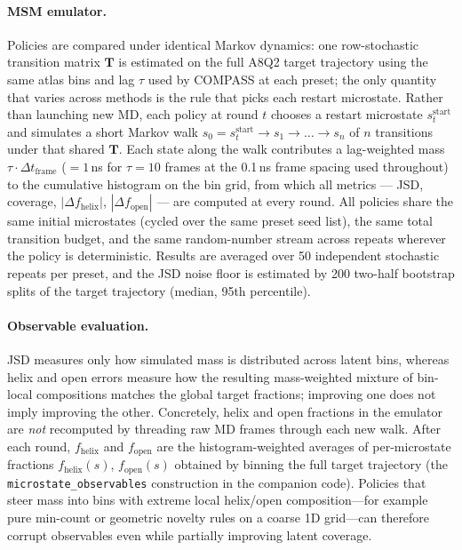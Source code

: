 \documentclass[journal=jctcce,manuscript=article,layout=twocolumn]{achemso}
\begin{document}
\paragraph{MSM emulator.} Policies are compared under identical Markov dynamics: one row-stochastic transition matrix $\mathbf{T}$ is estimated on the full A8Q2 target trajectory using the same atlas bins and lag $\tau$ used by COMPASS at each preset; the only quantity that varies across methods is the rule that picks each restart microstate. Rather than launching new MD, each policy at round $t$ chooses a restart microstate $s^{\mathrm{start}}_t$ and simulates a short Markov walk $s_0=s^{\mathrm{start}}_t \to s_1 \to \ldots \to s_{n}$ of $n$ transitions under that shared $\mathbf{T}$. Each state along the walk contributes a lag-weighted mass $\tau\cdot\Delta t_{\mathrm{frame}}$ ($=1$\,ns for $\tau=10$ frames at the 0.1\,ns frame spacing used throughout) to the cumulative histogram on the bin grid, from which all metrics --- JSD, coverage, $|\Delta f_{\mathrm{helix}}|$, $|\Delta f_{\mathrm{open}}|$ --- are computed at every round. All policies share the same initial microstates (cycled over the same preset seed list), the same total transition budget, and the same random-number stream across repeats wherever the policy is deterministic. Results are averaged over 50 independent stochastic repeats per preset, and the JSD noise floor is estimated by 200 two-half bootstrap splits of the target trajectory (median, 95th percentile).

\paragraph{Observable evaluation.} JSD measures only how simulated mass is distributed across latent bins, whereas helix and open errors measure how the resulting mass-weighted mixture of bin-local compositions matches the global target fractions; improving one does not imply improving the other. Concretely, helix and open fractions in the emulator are \emph{not} recomputed by threading raw MD frames through each new walk. After each round, $f_{\mathrm{helix}}$ and $f_{\mathrm{open}}$ are the histogram-weighted averages of per-microstate fractions $f_{\mathrm{helix}}(s)$, $f_{\mathrm{open}}(s)$ obtained by binning the full target trajectory (the \texttt{microstate\_observables} construction in the companion code). Policies that steer mass into bins with extreme local helix/open composition---for example pure min-count or geometric novelty rules on a coarse 1D grid---can therefore corrupt observables even while partially improving latent coverage.
\end{document}
